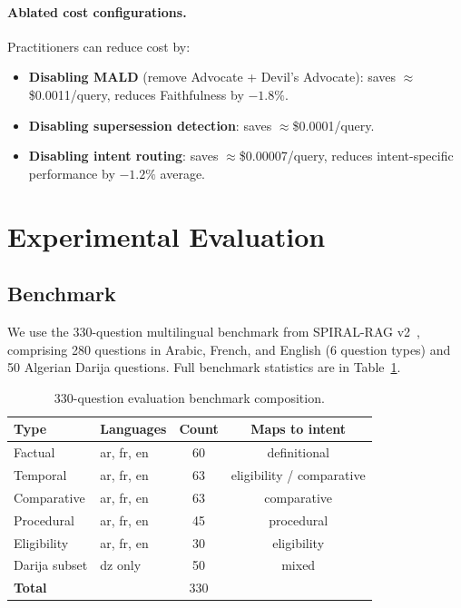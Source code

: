 \documentclass[12pt,a4paper]{article}
\begin{document}
\paragraph{Ablated cost configurations.} Practitioners can reduce cost by:
\begin{itemize}[leftmargin=*,nosep]
\item \textbf{Disabling MALD} (remove Advocate + Devil's Advocate): saves $\approx$\$0.0011/query,
  reduces Faithfulness by $-1.8\%$.
\item \textbf{Disabling supersession detection}: saves $\approx$\$0.0001/query.
\item \textbf{Disabling intent routing}: saves $\approx$\$0.00007/query, reduces
  intent-specific performance by $-1.2\%$ average.
\end{itemize}

\section{Experimental Evaluation}
\label{sec:experiments}

\subsection{Benchmark}

We use the 330-question multilingual benchmark from SPIRAL-RAG v2~\cite{spiral_v2},
comprising 280 questions in Arabic, French, and English (6 question types) and
50 Algerian Darija questions. Full benchmark statistics are in Table~\ref{tab:benchmark}.

\begin{table}[H]
\centering
\caption{330-question evaluation benchmark composition.}
\label{tab:benchmark}
\begin{tabular}{llcc}
\toprule
\textbf{Type} & \textbf{Languages} & \textbf{Count} & \textbf{Maps to intent} \\
\midrule
Factual        & ar, fr, en  & 60  & definitional \\
Temporal       & ar, fr, en  & 63  & eligibility / comparative \\
Comparative    & ar, fr, en  & 63  & comparative \\
Procedural     & ar, fr, en  & 45  & procedural \\
Eligibility    & ar, fr, en  & 30  & eligibility \\
Darija subset  & dz only     & 50  & mixed \\
\midrule
\textbf{Total} &             & 330 & \\
\bottomrule
\end{tabular}
\end{table}
\end{document}
